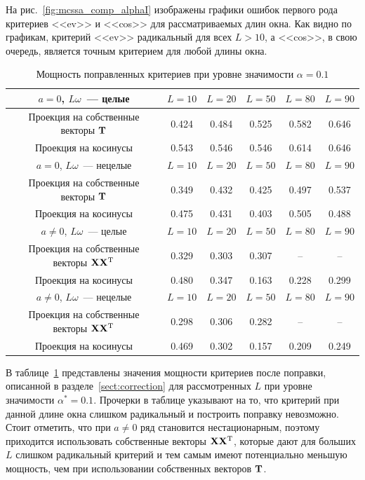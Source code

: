 \documentclass[specialist,
substylefile = spbu_report.rtx,
subf,href,colorlinks=true, 12pt]{disser}
\theoremstyle{definition}
\begin{document}
На рис.~\ref{fig:mcssa_comp_alphaI} изображены графики ошибок первого рода критериев <<ev>> и <<cos>> для рассматриваемых длин окна. Как видно по графикам, критерий <<ev>> радикальный для всех $L>10$, а <<cos>>, в свою очередь, является точным критерием для любой длины окна.

\begin{table}
	\centering
	\begin{tabular}{c|c|c|c|c|c}
		$a=0$, $L\omega$~--- целые & $L=10$ & $L=20$ & $L=50$ & $L=80$ & $L=90$ \\
		\hline
		Проекция на собственные векторы $\mathbf{T}$ & 0.424 & 0.484 & 0.525 & 0.582 & 0.646 \\
		\hline
		Проекция на косинусы & 0.543 & 0.546 & 0.546 & 0.614 & 0.646 \\
		\hhline{======}
		$a=0$, $L\omega$~--- нецелые & $L=10$ & $L=20$ & $L=50$ & $L=80$ & $L=90$ \\
		\hline
		Проекция на собственные векторы $\mathbf{T}$ & 0.349 & 0.432 & 0.425 & 0.497 & 0.537 \\
		\hline
		Проекция на косинусы & 0.475 & 0.431 & 0.403 & 0.505 & 0.488 \\
		\hhline{======}
		$a\ne0$, $L\omega$~--- целые & $L=10$ & $L=20$ & $L=50$ & $L=80$ & $L=90$ \\
		\hline
		Проекция на собственные векторы $\mathbf{X}\mathbf{X}^{\mathrm{T}}$ & 0.329 & 0.303 & 0.307 & -- & --\\
		\hline
		Проекция на косинусы & 0.480 & 0.347 & 0.163 & 0.228 & 0.299 \\
		\hhline{======}
		$a\ne0$, $L\omega$~--- нецелые & $L=10$ & $L=20$ & $L=50$ & $L=80$ & $L=90$ \\
		\hline
		Проекция на собственные векторы $\mathbf{X}\mathbf{X}^{\mathrm{T}}$ & 0.298 & 0.306 & 0.282 & -- & --\\
		\hline
		Проекция на косинусы & 0.469 & 0.302 & 0.157 & 0.209 & 0.249 \\
	\end{tabular}
	\caption{Мощность поправленных критериев при уровне значимости $\alpha=0.1$}
	\label{tab:mcssa_comp_power}
\end{table}

В таблице~\ref{tab:mcssa_comp_power} представлены значения мощности критериев после поправки, описанной в разделе~\ref{sect:correction} для рассмотренных $L$ при уровне значимости $\alpha^*=0.1$. Прочерки в таблице указывают на то, что критерий при данной длине окна слишком радикальный и построить поправку невозможно. Стоит отметить, что при $a\ne0$ ряд становится нестационарным, поэтому приходится использовать собственные векторы $\mathbf{X}\mathbf{X}^{\mathrm{T}}$, которые дают для больших $L$ слишком радикальный критерий и тем самым имеют потенциально меньшую мощность, чем при использовании собственных векторов $\mathbf{T}$.
\end{document}
